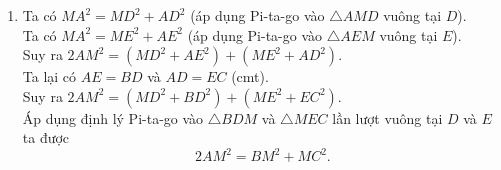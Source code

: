 \begin{vd}
{\begin{enumerate}
{
}
Xét $\triangle ADM$ vuông tại $D$ và $\triangle MEA$ vuông tại $E$ có\\
$\left. 
\begin{array}{l} 
AM: \quad \text{cạnh chung}\\
\widehat{DMA}=\widehat{EAM} \quad \text{(cmt)}
\end{array} 
\right\} \Rightarrow \triangle ADM=\triangle MEA$ (cạnh huyền - góc nhọn).\\
$\Rightarrow AD=ME$. 
Ta có $\triangle ABC$ cân tại $A$ nên $\widehat{C}=45^\circ$.\\
Khi đó $\triangle MEC$ vuông tại $E$ có $\widehat{C}=45^\circ$ nên vuông cân tại $E$.\\
$\Rightarrow ME=EC$. 
Từ $(1)$ và $(2)$ suy ra $AD=CE$.\\
Từ đó suy ra $BD=AB-AD=AC-CE=AE$.
\item Ta có $MA^2=MD^2+AD^2$ (áp dụng Pi-ta-go vào $\triangle AMD$ vuông tại $D$).\\
Ta có $MA^2=ME^2+AE^2$ (áp dụng Pi-ta-go vào $\triangle AEM$ vuông tại $E$).\\
Suy ra $2AM^2=\left(MD^2+AE^2\right) + \left( ME^2+AD^2\right)$.\\
Ta lại có $AE=BD$ và $AD=EC$ (cmt).\\
Suy ra $2AM^2=\left(MD^2+BD^2\right) + \left( ME^2+EC^2\right)$.\\
Áp dụng định lý Pi-ta-go vào $\triangle BDM$ và $\triangle MEC$ lần lượt vuông tại $D$ và $E$ ta được
$$2AM^2=BM^2+MC^2.$$
\end{enumerate}
}
\end{vd}

